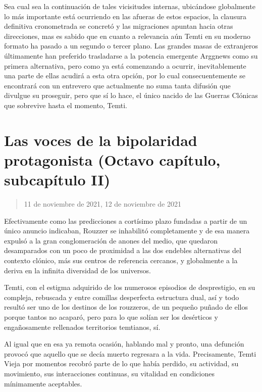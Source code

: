 \documentclass[
  spanish,
]{book}
\begin{document}
Sea cual sea la continuación de tales vicisitudes internas, ubicándose globalmente lo más importante está ocurriendo en las afueras de estos espacios, la clausura definitiva cronometrada se concretó y las migraciones apuntan hacia otras direcciones, mas es sabido que en cuanto a relevancia aún Temti en su moderno formato ha pasado a un segundo o tercer plano. Las grandes masas de extranjeros últimamente han preferido trasladarse a la potencia emergente Arggnews como su primera alternativa, pero como ya está comenzando a ocurrir, inevitablemente una parte de ellas acudirá a esta otra opción, por lo cual consecuentemente se encontrará con un entrevero que actualmente no suma tanta difusión que divulgue su proseguir, pero que sí lo hace, el único nacido de las Guerras Clónicas que sobrevive hasta el momento, Temti.

\hypertarget{las-voces-de-la-bipolaridad-protagonista-octavo-capuxedtulo-subcapuxedtulo-ii}{%
\section{Las voces de la bipolaridad protagonista (Octavo capítulo, subcapítulo II)}\label{las-voces-de-la-bipolaridad-protagonista-octavo-capuxedtulo-subcapuxedtulo-ii}}

\begin{quote}
11 de noviembre de 2021, 12 de noviembre de 2021
\end{quote}

Efectivamente como las predicciones a cortísimo plazo fundadas a partir de un único anuncio indicaban, Rouzzer se inhabilitó completamente y de esa manera expulsó a la gran conglomeración de anones del medio, que quedaron desamparados con un poco de proximidad a las dos endebles alternativas del contexto clónico, más sus centros de referencia cercanos, y globalmente a la deriva en la infinita diversidad de los universos.

Temti, con el estigma adquirido de los numerosos episodios de desprestigio, en su compleja, rebuscada y entre comillas desperfecta estructura dual, así y todo resultó ser uno de los destinos de los rouzzeros, de un pequeño puñado de ellos porque tantos no acaparó, pero para lo que solían ser los desérticos y engañosamente rellenados territorios temtianos, sí.

Al igual que en esa ya remota ocasión, hablando mal y pronto, una defunción provocó que aquello que se decía muerto regresara a la vida. Precisamente, Temti Vieja por momentos recobró parte de lo que había perdido, su actividad, su movimiento, sus interacciones continuas, su vitalidad en condiciones mínimamente aceptables.
\end{document}
